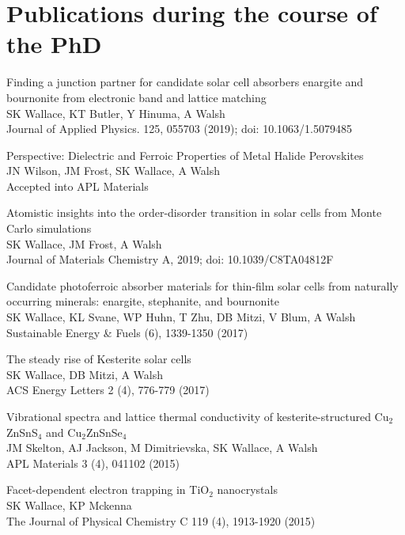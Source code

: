 \documentclass[11pt, twoside]{report}
\begin{document}
\section*{Publications during the course of the PhD}
\begin{etaremune}
\item Finding a junction partner for candidate solar cell absorbers enargite and bournonite from electronic band and lattice matching\\
SK Wallace, KT Butler, Y Hinuma, A Walsh\\
 Journal of Applied Physics. 125, 055703 (2019); doi: 10.1063/1.5079485
\item Perspective: Dielectric and Ferroic Properties of Metal Halide Perovskites\\
JN Wilson, JM Frost, SK Wallace, A Walsh\\
Accepted into APL Materials
\item Atomistic insights into the order-disorder transition in {\CZTS} solar cells from Monte Carlo simulations \\
SK Wallace, JM Frost, A Walsh\\
Journal of Materials Chemistry A, 2019; doi: 10.1039/C8TA04812F
\item Candidate photoferroic absorber materials for thin-film solar cells from naturally occurring minerals: enargite, stephanite, and bournonite\\
SK Wallace, KL Svane, WP Huhn, T Zhu, DB Mitzi, V Blum, A Walsh\\ Sustainable Energy \& Fuels  (6), 1339-1350 (2017)
\item The steady rise of Kesterite solar cells\\ SK Wallace, DB Mitzi, A Walsh\\ ACS Energy Letters 2 (4), 776-779 (2017)
\item Vibrational spectra and lattice thermal conductivity of kesterite-structured Cu$_2$ZnSnS$_4$ and Cu$_2$ZnSnSe$_4$\\ JM Skelton, AJ Jackson, M Dimitrievska, SK Wallace, A Walsh\\ APL Materials 3 (4), 041102 (2015)
\item Facet-dependent electron trapping in TiO$_2$ nanocrystals\\ SK Wallace, KP Mckenna\\ The Journal of Physical Chemistry C 119 (4), 1913-1920 (2015)
\end{etaremune}


\tableofcontents
{}
\listoffigures
{}
\listoftables
{}
\end{document}
